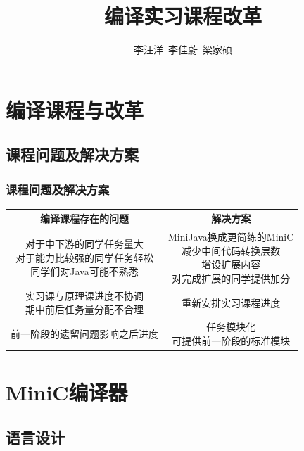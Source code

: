 \documentclass{beamer}
\title{编译实习课程改革}
\author{李汪洋\ 李佳蔚\ 梁家硕}
\date{}
\begin{document}
\frame{\titlepage}

\section{编译课程与改革}

\subsection{课程问题及解决方案}

\begin{frame}
    \frametitle{课程问题及解决方案}
    \begin{spacing}{1.3}
    \begin{table}
        \begin{tabular}{c|c}
            \hline \hline
            编译课程存在的问题 & 解决方案 \\
            \hline
            \makecell{对于中下游的同学任务量大\\对于能力比较强的同学任务轻松\\同学们对Java可能不熟悉} 
            & \makecell{MiniJava换成更简练的MiniC\\减少中间代码转换层数\\增设扩展内容\\对完成扩展的同学提供加分} \\
            \hline
            \makecell{实习课与原理课进度不协调\\期中前后任务量分配不合理}
            & 重新安排实习课程进度 \\
            \hline
            前一阶段的遗留问题影响之后进度
            & \makecell{任务模块化\\可提供前一阶段的标准模块} \\
            \hline \hline
        \end{tabular}
    \end{table}
    \end{spacing}
\end{frame}


\section{MiniC编译器}

\subsection{语言设计}
\end{document}

